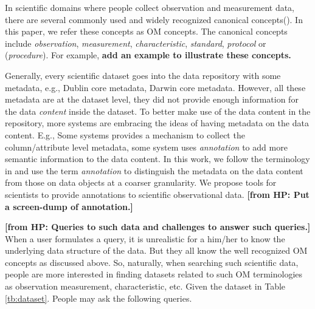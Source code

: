 \documentclass[conference]{IEEEtran}
\newcommand{\from}[2]{{\bf[{\sc from #1:} #2]}}
\begin{document}
In scientific domains where people collect observation and measurement
data, there are several commonly used and widely recognized canonical
concepts(\cite{oboe, om}). 
In this paper, we refer these concepts as OM concepts. 
The canonical concepts include {\em observation}, {\em measurement},
{\em characteristic}, {\em standard}, {\em protocol} or ({\em procedure}). 
For example, {\bf add an example to illustrate these concepts. }


Generally, every scientific dataset goes into the data repository with
some metadata, e.g., Dublin core metadata\cite{***}, Darwin core metadata\cite{***}. 
However, all these metadata are at the dataset level, they did not
provide enough information for the data {\em content} inside the
dataset. 
To better make use of the data content in the repository, more systems
are embracing the ideas of having metadata on the data content. 
E.g., Some systems \cite{tdar} provides a mechanism to collect the
column/attribute level metadata, some system \cite{semtools} uses
{\em annotation} to add more semantic information to the data
content. In this work, we follow the terminology in \cite{semtools} and
use the term {\em annotation} to distinguish the 
metadata on the data content from those on data objects at a coarser
granularity. 
We propose tools for scientists to provide annotations to scientific
observational data. 
\from{HP}{Put a screen-dump of annotation.}


\from{HP}{Queries to such data and challenges to answer such queries.}
When a user formulates a query, it is unrealistic for a him/her to know the 
underlying data structure of the data.  
But they all know the well recognized OM concepts as discussed above. 
So, naturally, when searching such scientific data, people are more
interested in finding datasets related to such OM terminologies as observation
measurement, characteristic, etc. 
Given the dataset in Table \ref{tb:dataset}. 
People may ask the following queries. 
\end{document}
